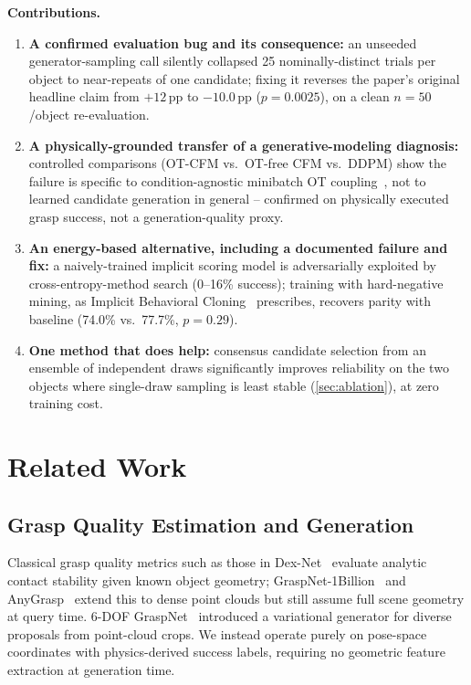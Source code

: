 \documentclass[journal]{IEEEtran}
\begin{document}
\noindent\textbf{Contributions.}
\begin{enumerate}
  \item \textbf{A confirmed evaluation bug and its consequence:} an unseeded
    generator-sampling call silently collapsed 25 nominally-distinct trials
    per object to near-repeats of one candidate; fixing it reverses the
    paper's original headline claim from $+12$\,pp to $-10.0$\,pp
    ($p{=}0.0025$), on a clean $n{=}50$/object re-evaluation.
  \item \textbf{A physically-grounded transfer of a generative-modeling
    diagnosis:} controlled comparisons (OT-CFM vs.\ OT-free CFM vs.\ DDPM)
    show the failure is specific to condition-agnostic minibatch OT
    coupling~\cite{cheng2025curse}, not to learned candidate generation in
    general -- confirmed on physically executed grasp success, not a
    generation-quality proxy.
  \item \textbf{An energy-based alternative, including a documented failure
    and fix:} a naively-trained implicit scoring model is adversarially
    exploited by cross-entropy-method search (0--16\% success); training
    with hard-negative mining, as Implicit Behavioral
    Cloning~\cite{florence2021implicit} prescribes, recovers parity with
    baseline (74.0\% vs.\ 77.7\%, $p{=}0.29$).
  \item \textbf{One method that does help:} consensus candidate selection
    from an ensemble of independent draws significantly improves reliability
    on the two objects where single-draw sampling is least stable
    (\cref{sec:ablation}), at zero training cost.
\end{enumerate}

\section{Related Work}
\label{sec:related}

\subsection{Grasp Quality Estimation and Generation}

Classical grasp quality metrics such as those in Dex-Net~\cite{mahler2017dexnet}
evaluate analytic contact stability given known object geometry;
GraspNet-1Billion~\cite{fang2020graspnet1b} and AnyGrasp~\cite{fang2023anygrasp}
extend this to dense point clouds but still assume full scene geometry at
query time. 6-DOF GraspNet~\cite{mousavian2019graspnet6dof} introduced a
variational generator for diverse proposals from point-cloud crops. We
instead operate purely on pose-space coordinates with physics-derived
success labels, requiring no geometric feature extraction at generation time.
\end{document}
